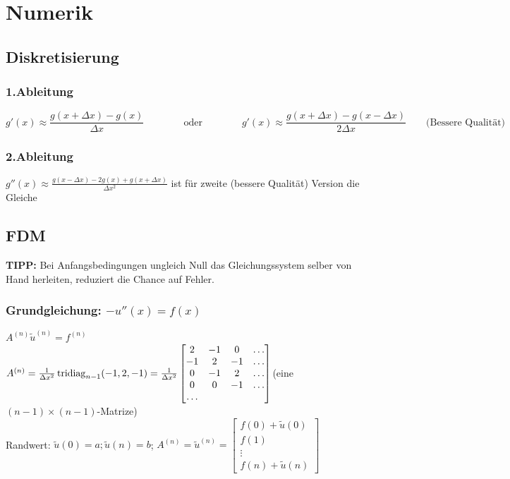 \section{Numerik}
\subsection{Diskretisierung}
\subsubsection{1.Ableitung}

$$g'(x)\approx \frac{g(x+\Delta x)-g(x)}{\Delta x} \qquad\qquad \text{oder} \qquad\qquad \boxed{g'(x)\approx \frac{g(x+\Delta x)-g(x-\Delta x)}{2\Delta x}}\qquad \text{(Bessere Qualität)}$$
\subsubsection{2.Ableitung}
$\boxed{g''(x)\approx \frac{g(x-\Delta x)-2 g(x) + g(x+ \Delta x)}{\Delta x^2}}$ ist für zweite (bessere Qualität) Version die Gleiche

\subsection{FDM}
\textbf{TIPP:} Bei Anfangsbedingungen ungleich Null das Gleichungssystem selber von Hand herleiten, reduziert die Chance auf Fehler.
\subsubsection{Grundgleichung: $-u''(x)=f(x)$}
$ A^{(n)} \tilde{u}^{(n)} =f^{(n)}   $\\
$A^{(n)}= \frac{1}{\Delta x^2} \operatorname{tridiag}_{n-1} (-1,2,-1) = \frac{1}{\Delta x^2}
  \begin{bmatrix}
             2& -1 & 0 & \ldots \\
             -1& 2 & -1 & \ldots \\
              0& -1 & 2 & \ldots \\
              0& 0 & -1 & \ldots \\
             \ldots 
           \end{bmatrix}$\qquad (eine $(n-1)\times(n-1)$-Matrize)\\ 
Randwert: $\tilde{u}(0)= a; \tilde{u}(n)=b $;
$A^{(n)}=\tilde{u}^{(n)} =\begin{bmatrix}
             f(0) + \tilde{u}(0) \\
             f(1) \\
             \vdots  \\
             f(n) + \tilde{u}(n)
           \end{bmatrix} $\\
